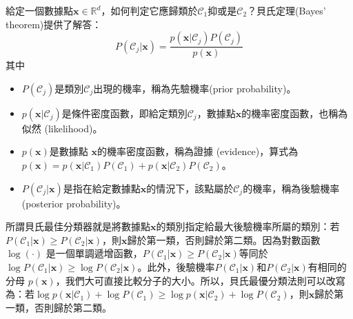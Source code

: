 給定一個數據點$\mathbf{x}\in\mathbb{R}^d$，如何判定它應歸類於$\mathcal{C}_1$抑或是$\mathcal{C}_2$？貝氏定理(Bayes’ theorem)提供了解答：
$$\displaystyle  P(\mathcal{C}_j\vert\mathbf{x})=\frac{p(\mathbf{x}\vert\mathcal{C}_j)P(\mathcal{C}_j)}{p(\mathbf{x})}$$
其中
\begin{itemize}
\item $P(\mathcal{C}_j)$是類別$\mathcal{C}_j$出現的機率，稱為先驗機率(prior probability)。
\item $p(\mathbf{x}\vert\mathcal{C}_j)$是條件密度函數，即給定類別$\mathcal{C}_j$，數據點$\mathbf{x}$的機率密度函數，也稱為似然 (likelihood)。
\item $p(\mathbf{x})$是數據點 $\mathbf{x}$的機率密度函數，稱為證據 (evidence)，算式為
$p(\mathbf{x})=p(\mathbf{x}\vert\mathcal{C}_1)P(\mathcal{C}_1)+p(\mathbf{x}\vert\mathcal{C}_2)P(\mathcal{C}_2)$。

\item $P(\mathcal{C}_j\vert\mathbf{x})$是指在給定數據點$\mathbf{x}$的情況下，該點屬於$\mathcal{C}_j$的機率，稱為後驗機率 (posterior probability)。
\end{itemize}

所謂貝氏最佳分類器就是將數據點$\mathbf{x}$的類別指定給最大後驗機率所屬的類別：若$P(\mathcal{C}_1\vert\mathbf{x})\ge P(\mathcal{C}_2\vert\mathbf{x})$，則$\mathbf{x}$歸於第一類，否則歸於第二類。因為對數函數$\log (\cdot)$ 是一個單調遞增函數，$P(\mathcal{C}_1\vert\mathbf{x})\ge P(\mathcal{C}_2\vert\mathbf{x})$等同於$\log P(\mathcal{C}_1\vert\mathbf{x})\ge \log P(\mathcal{C}_2\vert\mathbf{x})$。此外，後驗機率$P(\mathcal{C}_1\vert\mathbf{x})$和$P(\mathcal{C}_2\vert\mathbf{x})$有相同的分母 $p(\mathbf{x})$，我們大可直接比較分子的大小。所以，貝氏最優分類法則可以改寫為：若$\log p(\mathbf{x}\vert\mathcal{C}_1)+\log P(\mathcal{C}_1)\ge \log p(\mathbf{x}\vert\mathcal{C}_2)+\log P(\mathcal{C}_2)$，則$\mathbf{x}$歸於第一類，否則歸於第二類。

